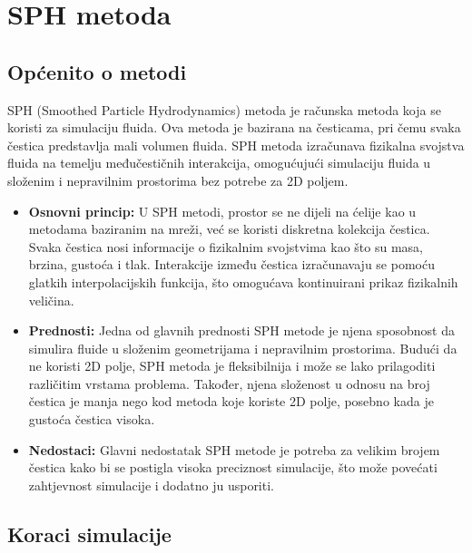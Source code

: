 \documentclass[diplomskirad]{fer}
\begin{document}
    \section{SPH metoda}\label{sec:sph-metoda}

    \subsection{Općenito o metodi}\label{subsec:opcenito-o-metodi}

    SPH\cite{SPHmethod} (Smoothed Particle Hydrodynamics) metoda je računska metoda koja se koristi za simulaciju fluida.
    Ova metoda je bazirana na česticama, pri čemu svaka čestica predstavlja mali volumen fluida.
    SPH metoda izračunava fizikalna svojstva fluida na temelju međučestičnih interakcija, omogućujući simulaciju fluida u složenim i nepravilnim prostorima bez potrebe za 2D poljem.

    \begin{itemize}
        \item \textbf{Osnovni princip:} U SPH metodi, prostor se ne dijeli na ćelije kao u metodama baziranim na mreži, već se koristi diskretna kolekcija čestica.
        Svaka čestica nosi informacije o fizikalnim svojstvima kao što su masa, brzina, gustoća i tlak.
        Interakcije između čestica izračunavaju se pomoću glatkih interpolacijskih funkcija, što omogućava kontinuirani prikaz fizikalnih veličina.
        \item \textbf{Prednosti:} Jedna od glavnih prednosti SPH metode je njena sposobnost da simulira fluide u složenim geometrijama i nepravilnim prostorima.
        Budući da ne koristi 2D polje, SPH metoda je fleksibilnija i može se lako prilagoditi različitim vrstama problema.
        Također, njena složenost u odnosu na broj čestica je manja nego kod metoda koje koriste 2D polje, posebno kada je gustoća čestica visoka.
        \item \textbf{Nedostaci:} Glavni nedostatak SPH metode je potreba za velikim brojem čestica kako bi se postigla visoka preciznost simulacije, što može povećati zahtjevnost simulacije i dodatno ju usporiti.
    \end{itemize}

    \newpage

    \subsection{Koraci simulacije}\label{subsec:koraci-simulacije}
\end{document}
